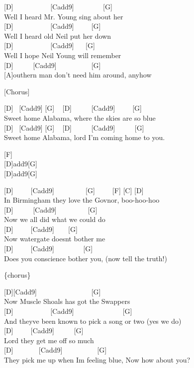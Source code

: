 \documentclass[
  letterpaper,
]{scrbook}
\begin{document}
{[}D{]} ~ ~ ~ ~ ~ ~ {[}Cadd9{]} ~ ~ ~ ~ ~{[}G{]}\\
Well I heard Mr. Young sing about her\\
{[}D{]} ~ ~ ~ ~ ~ ~ {[}Cadd9{]} ~ ~ ~{[}G{]}\\
Well I heard old Neil put her down\\
{[}D{]} ~ ~ ~ ~ ~ ~ {[}Cadd9{]} ~ ~{[}G{]}\\
Well I hope Neil Young will remember\\
{[}D{]} ~ ~ ~ {[}Cadd9{]} ~ ~ ~ ~ ~ ~{[}G{]} ~ ~ ~ ~ ~ ~ ~\\
{[}A{]}outhern man don't need him around, anyhow

{[}Chorus{]}

{[}D{]} ~{[}Cadd9{]} {[}G{]} ~ {[}D{]} ~ ~ ~ {[}Cadd9{]} ~ ~ ~{[}G{]} ~
~ ~ ~\\
Sweet home Alabama, where the skies are so blue\\
{[}D{]} ~{[}Cadd9{]} {[}G{]} ~ {[}D{]} ~ ~ ~ {[}Cadd9{]} ~ ~ ~ {[}G{]} ~
~\\
Sweet home Alabama, lord I'm coming home to you.

{[}F{]}\\
{[}D{]}add9{[}G{]}\\
{[}D{]}add9{[}G{]}

{[}D{]} ~ ~ ~{[}Cadd9{]} ~ ~ ~ ~ ~ {[}G{]} ~ ~ ~{[}F{]} {[}C{]}
{[}D{]}\\
In Birmingham they love the Gov\textquotesingle nor, boo-hoo-hoo\\
{[}D{]} ~ ~ ~ {[}Cadd9{]} ~ ~ ~ ~ ~ {[}G{]}\\
Now we all did what we could do\\
{[}D{]} ~ ~ ~{[}Cadd9{]} ~ ~ {[}G{]}\\
Now watergate doesn\textquotesingle t bother me\\
{[}D{]} ~ ~ ~{[}Cadd9{]} ~ ~ ~ ~ ~{[}G{]}\\
Does you conscience bother you, (now tell the truth!)

\{chorus\}

{[}D{]}{[}Cadd9{]} ~ ~ ~ ~ ~ ~ ~ ~ ~ {[}G{]}\\
Now Muscle Shoals has got the Swappers\\
{[}D{]} ~ ~ ~ ~ ~ ~ {[}Cadd9{]} ~ ~ ~ ~ ~ ~ ~ ~ {[}G{]}\\
And they\textquotesingle ve been known to pick a song or two (yes we
do)\\
{[}D{]} ~ ~ ~{[}Cadd9{]} ~ ~ ~ {[}G{]}\\
Lord they get me off so much\\
{[}D{]} ~ ~ ~ ~ {[}Cadd9{]} ~ ~ ~ ~ ~ ~{[}G{]} ~\\
They pick me up when I\textquotesingle m feeling blue, Now how about
you?
\end{document}
